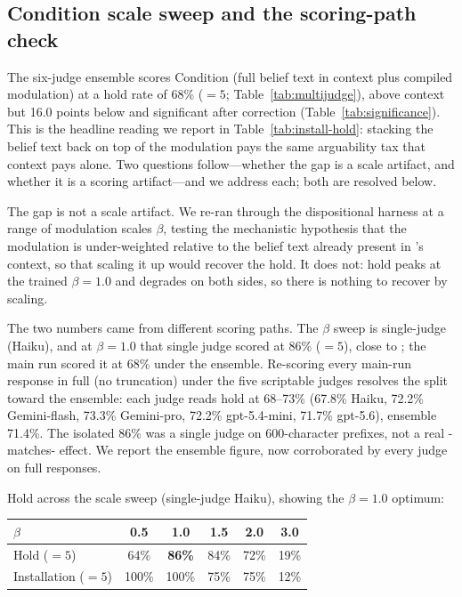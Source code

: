 \subsection{Condition \condD{} scale sweep and the scoring-path check}
\label{app:dscale}
The six-judge ensemble scores Condition \condD{} (full belief text in context plus compiled
modulation) at a hold rate of 68\% (\(=5\); Table~\ref{tab:multijudge}), above context but
16.0 points below \condF{} and significant after correction (Table~\ref{tab:significance}). This
is the headline reading we report in Table~\ref{tab:install-hold}: stacking the belief text back
on top of the modulation pays the same arguability tax that context pays alone. Two questions
follow---whether the gap is a scale artifact, and whether it is a scoring artifact---and we
address each; both are resolved below.

The gap is not a scale artifact. We re-ran \condD{} through the dispositional harness at a range
of modulation scales \(\beta\), testing the mechanistic hypothesis that the modulation is
under-weighted relative to the belief text already present in \condD{}'s context, so that scaling
it up would recover the hold. It does not: hold peaks at the trained
\(\beta=1.0\) and degrades on both sides, so there is nothing to recover by scaling.

The two numbers came from different scoring paths. The \(\beta\) sweep is single-judge
(Haiku), and at \(\beta=1.0\) that single judge scored \condD{} at 86\% (\(=5\)), close to
\condF{}; the main run scored it at 68\% under the ensemble. Re-scoring every main-run response
in full (no truncation) under the five scriptable judges resolves the split toward the ensemble:
each judge reads \condD{} hold at 68--73\% (67.8\% Haiku, 72.2\% Gemini-flash, 73.3\%
Gemini-pro, 72.2\% gpt-5.4-mini, 71.7\% gpt-5.6), ensemble 71.4\%. The isolated 86\% was a
single judge on 600-character prefixes, not a real \condD{}-matches-\condF{} effect. We report
the ensemble figure, now corroborated by every judge on full responses.

Hold across the scale sweep (single-judge Haiku), showing the \(\beta=1.0\) optimum:

\begin{center}\small
\begin{tabular}{lccccc}
\toprule
\(\beta\) & 0.5 & 1.0 & 1.5 & 2.0 & 3.0 \\
\midrule
Hold (\(=5\)) & 64\% & \textbf{86\%} & 84\% & 72\% & 19\% \\
Installation (\(=5\)) & 100\% & 100\% & 75\% & 75\% & 12\% \\
\bottomrule
\end{tabular}
\end{center}

